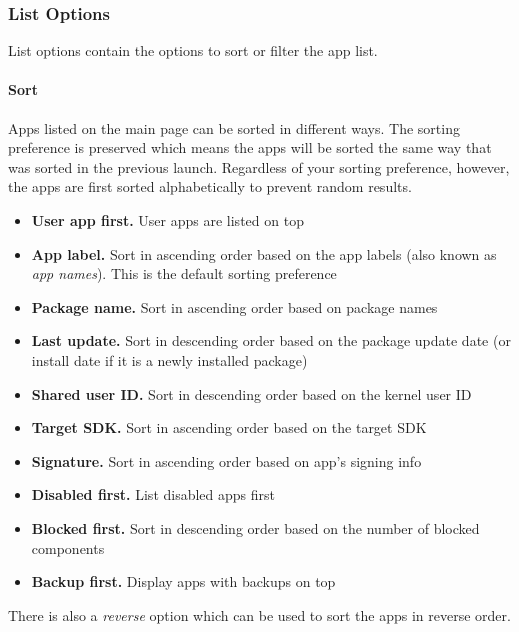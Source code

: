\subsubsection{List Options}\label{subsubsec:main-list-options} %
List options contain the options to sort or filter the app list.

\paragraph{Sort}\hypertarget{par:main-page-sort}{} %
Apps listed on the main page can be sorted in different ways. The sorting preference is preserved which means the apps
will be sorted the same way that was sorted in the previous launch. Regardless of your sorting preference, however, the
apps are first sorted alphabetically to prevent random results.
\begin{itemize}
    \item \textbf{User app first.} User apps are listed on top
    \item \textbf{App label.} Sort in ascending order based on the app labels (also known as \textit{app names}). This
    is the default sorting preference
    \item \textbf{Package name.} Sort in ascending order based on package names
    \item \textbf{Last update.} Sort in descending order based on the package update date (or install date if it is a
    newly installed package)
    \item \textbf{Shared user ID.} Sort in descending order based on the kernel user ID
    \item \textbf{Target SDK.} Sort in ascending order based on the target SDK
    \item \textbf{Signature.} Sort in ascending order based on app's signing info
    \item \textbf{Disabled first.} List disabled apps first
    \item \textbf{Blocked first.} Sort in descending order based on the number of blocked components
    \item \textbf{Backup first.} Display apps with backups on top
\end{itemize}

There is also a \textit{reverse} option which can be used to sort the apps in reverse order.

